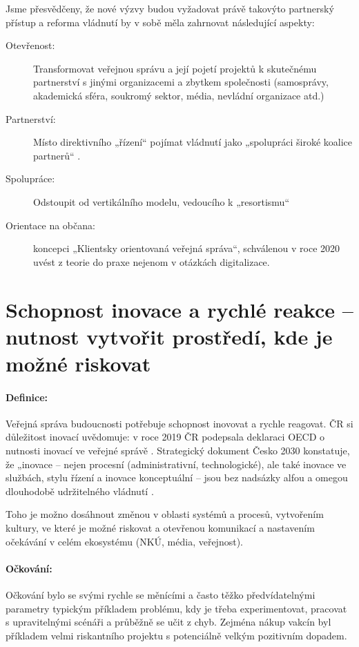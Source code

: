 Jsme přesvědčeny, že nové výzvy budou vyžadovat právě takovýto partnerský přístup \cite{christopher_blueprint_2021} a reforma vládnutí by v sobě měla zahrnovat následující aspekty:

\begin{description}
  \item[Otevřenost:] Transformovat veřejnou správu a její pojetí projektů k skutečnému partnerství s jinými organizacemi a zbytkem společnosti (samosprávy, akademická sféra, soukromý sektor, média, nevládní organizace atd.)
  \item[Partnerství:] Místo direktivního „řízení“ pojímat vládnutí jako „spolupráci široké koalice partnerů“ \cite{department_of_the_prime_minister_and_cabinet_our_2019}.
  \item[Spolupráce:] Odstoupit od vertikálního modelu, vedoucího k „resortismu“
  \item[Orientace na občana:] koncepci „Klientsky orientovaná veřejná správa“, schválenou v roce 2020 \cite{koncepce_verejna_sprava_2030} uvést z teorie do praxe nejenom v otázkách digitalizace.
\end{description}

\section*{Schopnost inovace a rychlé reakce -- nutnost vytvořit prostředí, kde je možné riskovat}

\paragraph{Definice:} Veřejná správa budoucnosti potřebuje schopnost inovovat a rychle reagovat. ČR si důležitost inovací uvědomuje: v roce 2019 ČR podepsala deklaraci OECD o nutnosti inovací ve veřejné správě \cite{oecd_deklarace_2019}. Strategický dokument Česko 2030 konstatuje, že „inovace – nejen procesní (administrativní, technologické), ale také inovace ve službách, stylu řízení a inovace konceptuální – jsou bez nadsázky alfou a omegou dlouhodobě udržitelného vládnutí \cite{sr2030}.

Toho je možno dosáhnout změnou v oblasti systémů a procesů, vytvořením kultury, ve které je možné riskovat a otevřenou komunikací a nastavením očekávání v celém ekosystému (NKÚ, média, veřejnost).

\paragraph{Očkování:} Očkování bylo se svými rychle se měnícími a často těžko předvídatelnými parametry typickým příkladem problému, kdy je třeba experimentovat, pracovat s upravitelnými scénáři a průběžně se učit z chyb. Zejména nákup vakcín byl příkladem velmi riskantního projektu s potenciálně velkým pozitivním dopadem.

